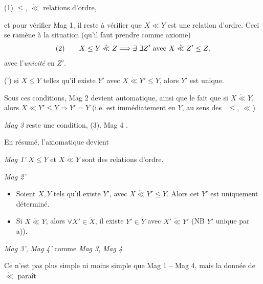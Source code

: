 \documentclass[11pt,a4paper]{article}
\begin{document}
(1) $\leq$, $\mathring{\ll}$ \struck{\ill{}} 
relations d'ordre,

et pour vérifier Mag 1, il reste à vérifier que $X \ll Y$ est une relation
d'ordre. Ceci se ramène à la situation (qu'il faut 
prendre comme axiome)
\[
  (2) \qquad X \leq Y \mathrel{\mathring{\ll}} Z \Longrightarrow
  \text{\struck{$\exists$}}\ \exists Z' \text{ avec } X \mathrel{\mathring{\ll}} Z' \leq Z ,
\]
avec \struck{\ill{}} l'\emph{unicité} en $Z'$. 

\emph{} (') si $X \leq Y$ telles qu'il
existe $Y'$ avec $X \mathrel{\mathring{\ll}} Y' \leq Y$, alors $Y'$ est unique.

Sous ces conditions, Mag 2 devient automatique, ainsi que le fait que si
$X \mathrel{\mathring{\ll}} Y$, alors  \struck{\ill{}}
$X \ll Y' \leq Y \Rightarrow Y' = Y$ (i.e.  est  immédiatement en $Y$, au sens des \ $\leq$, $\ll$)

\emph{Mag 3} reste une condition, (3). Mag 4 .

En résumé, l'axiomatique devient

\emph{Mag 1'} $X \leq Y$ et $X \mathrel{\mathring{\ll}} Y$ sont des relations
d'ordre.

\emph{Mag 2'}
\begin{itemize}
  \item[a)] Soient $X, Y$ tels qu'il existe $Y'$, avec
    $X \mathrel{\mathring{\ll}} Y' \leq Y$. Alors cet $Y'$ est uniquement
    déterminé.
  \item[b)] Si \struck{$\mathring{\ll}$} $X \mathrel{\mathring{\ll}} Y$, alors
    $\forall X' \in \widetilde{X}$, il existe $Y' \in \widetilde{Y}$ avec
    $X' \mathrel{\mathring{\ll}} Y'$ (NB $Y'$ unique par a)).
\end{itemize}

\emph{Mag 3'}, \emph{Mag 4'} comme \emph{Mag 3}, \emph{Mag 4}


Ce n'est pas plus simple ni moins simple que Mag 1 -- Mag 4, mais la donnée
de $\mathring{\ll}$ paraît
\end{document}
